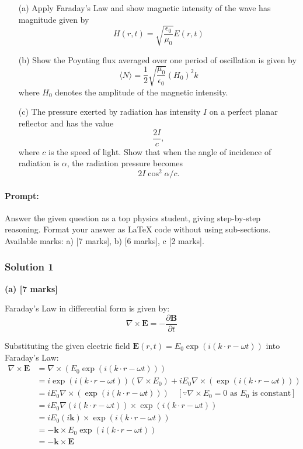 \documentclass{article}
\begin{document}
\begin{enumerate}
    \item[(a)] Apply Faraday’s Law and show magnetic intensity of the wave has magnitude given by
    \[
    H(r, t) = \sqrt{\frac{\epsilon_0}{\mu_0}} E(r, t)
    \]

    \item[(b)] Show the Poynting flux averaged over one period of oscillation is given by
    \[
    \langle N \rangle = \frac{1}{2} \sqrt{\frac{\mu_0}{\epsilon_0}} (H_0)^2 \hat{k}
    \]
    where \(H_0\) denotes the amplitude of the magnetic intensity.

    \item[(c)] The pressure exerted by radiation has intensity \(I\) on a perfect planar reflector and has the value
    \[
    \frac{2I}{c},
    \]
    where \(c\) is the speed of light. Show that when the angle of incidence of radiation is \(\alpha\), the radiation pressure becomes
    \[
    2I \cos^2 \alpha / c.
    \]
\end{enumerate}


\paragraph{Prompt: \\} 
Answer the given question as a top physics student, giving step-by-step reasoning. Format your answer as LaTeX code without using sub-sections. Available marks: a) [7 marks], b) [6 marks], c [2 marks].

\subsubsection{Solution 1}
\textbf{(a) [7 marks]}

Faraday's Law in differential form is given by:
\begin{equation*}
\nabla \times \mathbf{E} = -\frac{\partial \mathbf{B}}{\partial t}
\end{equation*}

Substituting the given electric field $\mathbf{E}(r, t) = E_0 \exp(i (k \cdot r - \omega t))$ into Faraday's Law:
\begin{align*}
\nabla \times \mathbf{E} &= \nabla \times (E_0 \exp(i (k \cdot r - \omega t))) \\
&= i  \exp(i (k \cdot r - \omega t)) (\nabla \times E_0) + i E_0 \nabla \times (\exp(i (k \cdot r - \omega t))) \\
&= i E_0 \nabla \times (\exp(i (k \cdot r - \omega t))) \quad [\because \nabla \times E_0 = 0 \text{ as } E_0 \text{ is constant}]\\
&= i E_0  \nabla (i (k \cdot r - \omega t)) \times \exp(i (k \cdot r - \omega t)) \\
&= i E_0 (i \mathbf{k}) \times \exp(i (k \cdot r - \omega t)) \\
&= - \mathbf{k} \times E_0 \exp(i (k \cdot r - \omega t)) \\
&= - \mathbf{k} \times \mathbf{E}
\end{align*}
\end{document}
